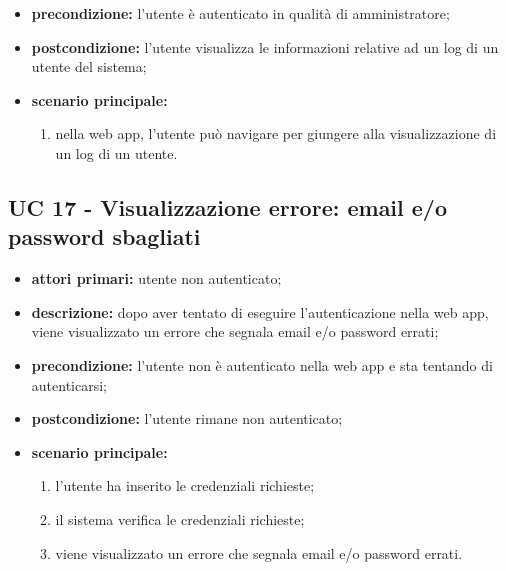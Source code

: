 \begin{itemize}
			\item \textbf{precondizione:} l'utente è autenticato in qualità di amministratore;
			\item \textbf{postcondizione:} l'utente visualizza le informazioni relative ad un log di un utente del sistema;
			\item \textbf{scenario principale:}
			\begin{enumerate}
				\item nella web app, l'utente può navigare per giungere alla visualizzazione di un log di un utente.
			\end{enumerate}
		\end{itemize}



		


		


		


		\subsection{UC 17 - Visualizzazione errore: email e/o password sbagliati}
		\begin{itemize}
			\item \textbf{attori primari:} utente non autenticato;
			\item \textbf{descrizione:} dopo aver tentato di eseguire l'autenticazione nella web app, viene visualizzato un errore che segnala email e/o password errati;
			\item \textbf{precondizione:} l'utente non è autenticato nella web app e sta tentando di autenticarsi;
			\item \textbf{postcondizione:} l'utente rimane non autenticato;
			\item \textbf{scenario principale:}
			\begin{enumerate}
				\item l'utente ha inserito le credenziali richieste;
				\item il sistema verifica le credenziali richieste;
				\item viene visualizzato un errore che segnala email e/o password errati.
			\end{enumerate}
		\end{itemize}

